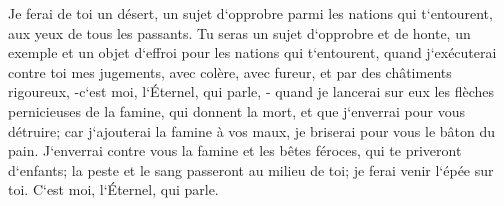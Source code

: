 \verse Je ferai de toi un désert, un sujet d`opprobre parmi les nations qui t`entourent, aux yeux de tous les passants. 
\verse Tu seras un sujet d`opprobre et de honte, un exemple et un objet d`effroi pour les nations qui t`entourent, quand j`exécuterai contre toi mes jugements, avec colère, avec fureur, et par des châtiments rigoureux, -c`est moi, l`Éternel, qui parle, - 
\verse quand je lancerai sur eux les flèches pernicieuses de la famine, qui donnent la mort, et que j`enverrai pour vous détruire; car j`ajouterai la famine à vos maux, je briserai pour vous le bâton du pain. 
\verse J`enverrai contre vous la famine et les bêtes féroces, qui te priveront d`enfants; la peste et le sang passeront au milieu de toi; je ferai venir l`épée sur toi. C`est moi, l`Éternel, qui parle. 

\chapter{}

